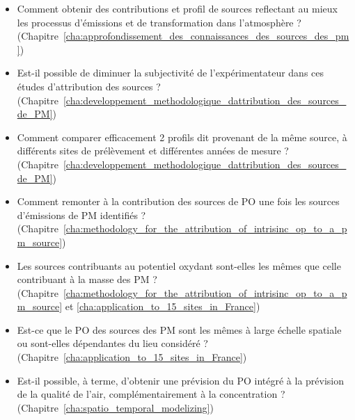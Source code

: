 \begin{itemize}
    \item Comment obtenir des contributions et profil de sources reflectant au mieux les
        processus d'émissions et de transformation dans l'atmosphère ?
        (Chapitre~\ref{cha:approfondissement_des_connaissances_des_sources_des_pm})
    \item Est-il possible de diminuer la subjectivité de l'expérimentateur dans ces
        études d'attribution des sources ?
        (Chapitre~\ref{cha:developpement_methodologique_dattribution_des_sources_de_PM})
    \item Comment comparer efficacement 2 profils dit provenant de la même source, à
        différents sites de prélèvement et différentes années de mesure ?
        (Chapitre~\ref{cha:developpement_methodologique_dattribution_des_sources_de_PM})
    \item Comment remonter à la contribution des sources de PO une fois les sources
        d'émissions de PM identifiés ?
        (Chapitre~\ref{cha:methodology_for_the_attribution_of_intrisinc_op_to_a_pm_source})
    \item Les sources contribuants au potentiel oxydant sont-elles les mêmes que celle
        contribuant à la masse des PM ?
        (Chapitre~\ref{cha:methodology_for_the_attribution_of_intrisinc_op_to_a_pm_source}
        et \ref{cha:application_to_15_sites_in_France})
    \item Est-ce que le PO des sources des PM sont les mêmes à large échelle spatiale ou
        sont-elles dépendantes du lieu considéré ?
        (Chapitre~\ref{cha:application_to_15_sites_in_France})
    \item Est-il possible, à terme, d'obtenir une prévision du PO intégré à la prévision de la
        qualité de l'air, complémentairement à la concentration ?
        (Chapitre~\ref{cha:spatio_temporal_modelizing})
\end{itemize}



\printbibliography[segment=\therefsegment,heading=subbibliography]


